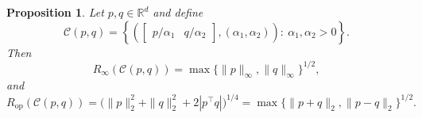 \documentclass{article}
\newtheorem{proposition}{Proposition}[section]
\begin{document}
\begin{proposition}
Let $p,q\in\mathbb R^d$ and define
\[
\mathcal{C}(p,q)
=
\left\{
\left(
\begin{bmatrix}
p/\alpha_1 & q/\alpha_2
\end{bmatrix},
(\alpha_1,\alpha_2)
\right)
:\ \alpha_1,\alpha_2>0
\right\}.
\]
Then
\[
R_{\infty}(\mathcal{C}(p,q))
=
\max\{\|p\|_\infty,\|q\|_\infty\}^{1/2},
\]
and
\[
R_{\mathrm{op}}(\mathcal{C}(p,q))
=
\bigl(\|p\|_2^2+\|q\|_2^2+2|p^\top q|\bigr)^{1/4} = \max \{\|p+q\|_2, \|p-q\|_2\}^{1/2}.
\]
\end{proposition}
\end{document}
